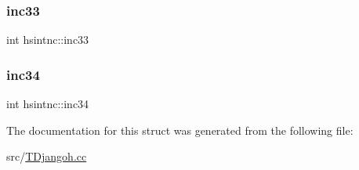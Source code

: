 \subsubsection{\texorpdfstring{inc33}{inc33}}
{\footnotesize\ttfamily int hsintnc\+::inc33}

\mbox{\label{structhsintnc_a015cc652162a36a9fc32ea1326f633fc}} 
\subsubsection{\texorpdfstring{inc34}{inc34}}
{\footnotesize\ttfamily int hsintnc\+::inc34}



The documentation for this struct was generated from the following file\+:\begin{DoxyCompactItemize}
\item 
src/\hyperlink{_t_djangoh_8cc}{T\+Djangoh.\+cc}\end{DoxyCompactItemize}
